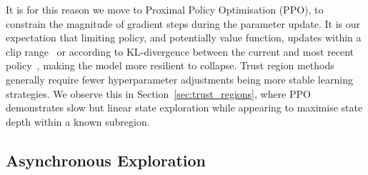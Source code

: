 \documentclass[runningheads]{llncs}
\begin{document}
It is for this reason we move to Proximal Policy Optimisation (PPO), to constrain the magnitude of gradient steps during the parameter update. It is our expectation that limiting policy, and potentially value function, updates within a clip range~\cite{schulman2017proximal} or according to KL-divergence between the current and most recent policy~\cite{schulman2017trust}, making the model more resilient to collapse. Trust region methods generally require fewer hyperparameter adjustments being more stable learning strategies. We observe this in Section~\ref{sec:trust_regions}, where PPO demonstrates slow but linear state exploration while appearing to maximise state depth within a known subregion.

\subsection{Asynchronous Exploration}\label{sec:asynch}
\end{document}
